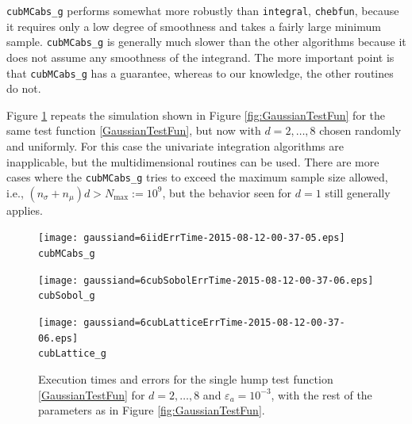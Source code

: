 \documentclass{iitthesis}
\begin{document}
 {\tt cubMCabs\_g}  performs somewhat more robustly than {\tt integral}, {\tt chebfun}, because it requires only a low degree of smoothness and takes a fairly large minimum sample.  {\tt cubMCabs\_g} is generally much slower than the other algorithms because it does not assume any smoothness of the integrand. The more important point is that  {\tt cubMCabs\_g}  has a guarantee, whereas to our knowledge, the other routines do not.
%
%

Figure \ref{fig:GaussianTestFunHD} repeats the simulation shown in Figure \ref{fig:GaussianTestFun} for the same test function \eqref{GaussianTestFun}, but now with $d=2, \ldots, 8$ chosen randomly and uniformly.  For this case the univariate integration algorithms are inapplicable, but the multidimensional routines can be used.  There are more cases where the {\tt cubMCabs\_g} tries to exceed the maximum sample size allowed, i.e., $(n_{\sigma}+n_\mu)d > N_{\max}:=10^9$, but the behavior seen for $d=1$ still generally applies.  

\begin{figure}
\centering
\begin{minipage}{9cm} \centering \texttt{[image: gaussiand=6iidErrTime-2015-08-12-00-37-05.eps]} \\ {\tt cubMCabs\_g} \end{minipage}
\begin{minipage}{7cm} \centering \texttt{[image: gaussiand=6cubSobolErrTime-2015-08-12-00-37-06.eps]} \\ {\tt cubSobol\_g} \end{minipage}
\begin{minipage}{7cm} \centering \texttt{[image: gaussiand=6cubLatticeErrTime-2015-08-12-00-37-06.eps]} \\ {\tt cubLattice\_g} \end{minipage}
\caption{Execution times and errors for the single hump test function \eqref{GaussianTestFun} for $d=2, \ldots, 8$ and $\varepsilon_a=10^{-3}$, with the rest of the parameters as in Figure \ref{fig:GaussianTestFun}.\label{fig:GaussianTestFunHD}}
\end{figure}
\end{document}
